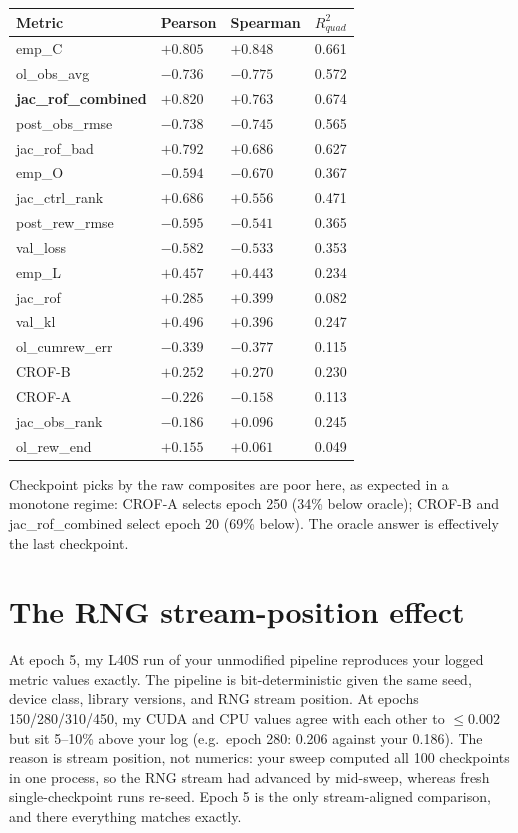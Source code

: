 \documentclass[11pt]{article}
\begin{document}
\begin{longtable}[]{@{}llll@{}}
\toprule\noalign{}
Metric & Pearson & Spearman & \(R^2_{quad}\) \\
\midrule\noalign{}
\endhead
\bottomrule\noalign{}
\endlastfoot
emp\_C & \(+0.805\) & \(+0.848\) & 0.661 \\
ol\_obs\_avg & \(-0.736\) & \(-0.775\) & 0.572 \\
\textbf{jac\_rof\_combined} & \(+0.820\) & \(+0.763\) & 0.674 \\
post\_obs\_rmse & \(-0.738\) & \(-0.745\) & 0.565 \\
jac\_rof\_bad & \(+0.792\) & \(+0.686\) & 0.627 \\
emp\_O & \(-0.594\) & \(-0.670\) & 0.367 \\
jac\_ctrl\_rank & \(+0.686\) & \(+0.556\) & 0.471 \\
post\_rew\_rmse & \(-0.595\) & \(-0.541\) & 0.365 \\
val\_loss & \(-0.582\) & \(-0.533\) & 0.353 \\
emp\_L & \(+0.457\) & \(+0.443\) & 0.234 \\
jac\_rof & \(+0.285\) & \(+0.399\) & 0.082 \\
val\_kl & \(+0.496\) & \(+0.396\) & 0.247 \\
ol\_cumrew\_err & \(-0.339\) & \(-0.377\) & 0.115 \\
CROF-B & \(+0.252\) & \(+0.270\) & 0.230 \\
CROF-A & \(-0.226\) & \(-0.158\) & 0.113 \\
jac\_obs\_rank & \(-0.186\) & \(+0.096\) & 0.245 \\
ol\_rew\_end & \(+0.155\) & \(+0.061\) & 0.049 \\
\end{longtable}

Checkpoint picks by the raw composites are poor here, as expected in a
monotone regime: CROF-A selects epoch 250 (34\% below oracle); CROF-B
and jac\_rof\_combined select epoch 20 (69\% below). The oracle answer
is effectively the last checkpoint.

\section{The RNG stream-position
effect}\label{the-rng-stream-position-effect}

At epoch 5, my L40S run of your unmodified pipeline reproduces your logged
metric values exactly. The pipeline is bit-deterministic given the same seed, device class, library
versions, and RNG stream position. At epochs 150/280/310/450, my CUDA
and CPU values agree with each other to \(\le 0.002\) but sit 5--10\%
above your log (e.g.~epoch 280: 0.206 against your 0.186). The reason is
stream position, not numerics: your sweep computed all 100 checkpoints
in one process, so the RNG stream had advanced by mid-sweep, whereas
fresh single-checkpoint runs re-seed. Epoch 5 is the only stream-aligned
comparison, and there everything matches exactly.
\end{document}
